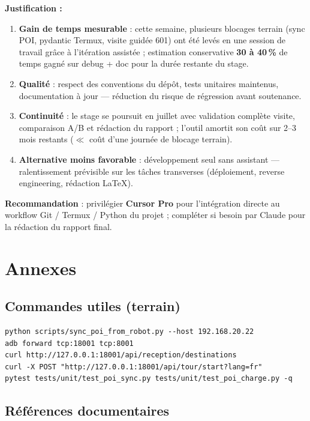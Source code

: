 \documentclass[11pt,a4paper]{article}
\begin{document}
\textbf{Justification :}
\begin{enumerate}[noitemsep]
  \item \textbf{Gain de temps mesurable} : cette semaine, plusieurs blocages terrain (sync POI, pydantic Termux, visite guidée 601) ont été levés en une session de travail grâce à l'itération assistée ; estimation conservative \textbf{30 à 40\,\%} de temps gagné sur debug + doc pour la durée restante du stage.
  \item \textbf{Qualité} : respect des conventions du dépôt, tests unitaires maintenus, documentation à jour — réduction du risque de régression avant soutenance.
  \item \textbf{Continuité} : le stage se poursuit en juillet avec validation complète visite, comparaison A/B et rédaction du rapport ; l'outil amortit son coût sur 2--3 mois restants ($\ll$ coût d'une journée de blocage terrain).
  \item \textbf{Alternative moins favorable} : développement seul sans assistant — ralentissement prévisible sur les tâches transverses (déploiement, reverse engineering, rédaction LaTeX).
\end{enumerate}

\textbf{Recommandation} : privilégier \textbf{Cursor Pro} pour l'intégration directe au workflow Git / Termux / Python du projet ; compléter si besoin par Claude pour la rédaction du rapport final.

\section{Annexes}

\subsection{Commandes utiles (terrain)}

\begin{verbatim}
python scripts/sync_poi_from_robot.py --host 192.168.20.22
adb forward tcp:18001 tcp:8001
curl http://127.0.0.1:18001/api/reception/destinations
curl -X POST "http://127.0.0.1:18001/api/tour/start?lang=fr"
pytest tests/unit/test_poi_sync.py tests/unit/test_poi_charge.py -q
\end{verbatim}

\subsection{Références documentaires}
\end{document}
